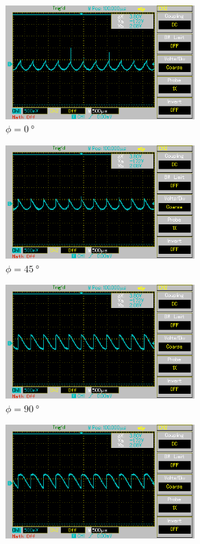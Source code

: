 \begin{figure}%
    \begin{subfigure}{0.5\textwidth}%
    \centering%
    \includegraphics[width = 7.3cm]{./Oszilloskop Bilder/png/5.2/1 MAP002.png}%
    \caption{$\phi = \qty[]{0}{\degree}$}%
    \label{fig:phase1}%
    \end{subfigure}%
    \hfill%
    \begin{subfigure}{0.5\textwidth}%
    \centering%
    \includegraphics[width = 7.3cm]{./Oszilloskop Bilder/png/5.2/2 MAP003.png}%
    \caption{$\phi = \qty[]{45}{\degree}$}%
    \label{fig:phase2}%
    \end{subfigure}%
    \hfill
    \begin{subfigure}{0.5\textwidth}%
    \centering%
    \includegraphics[width = 7.3cm]{./Oszilloskop Bilder/png/5.2/3 MAP004.png}%
    \caption{$\phi = \qty[]{90}{\degree}$}%
    \label{fig:phase3}%
    \end{subfigure}%
    \hfill%
    \begin{subfigure}{0.5\textwidth}%
    \centering%
    \includegraphics[width = 7.3cm]{./Oszilloskop Bilder/png/5.2/4 MAP005.png}%

\end{subfigure}
\end{figure}
